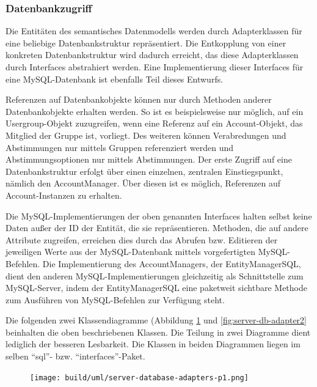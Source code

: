 \documentclass[parskip=full,11pt]{scrartcl}
\begin{document}
\subsubsection{Datenbankzugriff}
Die Entitäten des semantisches Datenmodells werden durch Adapterklassen für
eine beliebige Datenbankstruktur repräsentiert.
Die Entkopplung von einer konkreten Datenbankstruktur wird dadurch erreicht,
das diese Adapterklassen durch Interfaces abstrahiert werden.
Eine Implementierung dieser Interfaces für eine MySQL-Datenbank ist ebenfalls
Teil dieses Entwurfs.

\par Referenzen auf Datenbankobjekte können nur durch Methoden anderer
Datenbankobjekte erhalten werden.
So ist es beispielsweise nur möglich, auf ein Usergroup-Objekt zuzugreifen,
wenn eine Referenz auf ein Account-Objekt, das Mitglied der Gruppe ist,
vorliegt.
Des weiteren können Verabredungen und Abstimmungen nur mittels Gruppen
referenziert werden und Abstimmungsoptionen nur mittels Abstimmungen.
Der erste Zugriff auf eine Datenbankstruktur erfolgt über einen einzelnen,
zentralen Einstiegspunkt, nämlich den AccountManager.
Über diesen ist es möglich, Referenzen auf Account-Instanzen zu erhalten.

\par Die MySQL-Implementierungen der oben genannten Interfaces halten selbst
keine Daten außer der ID der Entität, die sie repräsentieren.
Methoden, die auf andere Attribute zugreifen, erreichen dies durch das Abrufen
bzw. Editieren der jeweiligen Werte aus der MySQL-Datenbank mittels
vorgefertigten MySQL-Befehlen.
Die Implementierung des AccountManagers, der EntityManagerSQL, dient den
anderen MySQL-Implementierungen gleichzeitig als Schnittstelle zum
MySQL-Server, indem der EntityManagerSQL eine paketweit sichtbare Methode zum
Ausführen von MySQL-Befehlen zur Verfügung steht.

\par Die folgenden zwei Klassendiagramme (Abbildung
    \ref{fig:server-db-adapter1} und \ref{fig:server-db-adapter2} beinhalten
    die oben beschriebenen Klassen.  Die Teilung in zwei Diagramme dient
    lediglich der besseren Lesbarkeit.
Die Klassen in beiden Diagrammen liegen im selben \enquote{sql}- bzw.
\enquote{interfaces}-Paket.

\begin{figure}[!htb]
    \centering
    \texttt{[image: build/uml/server-database-adapters-p1.png]}
	\label{fig:server-db-adapter1}
\end{figure}
\end{document}
